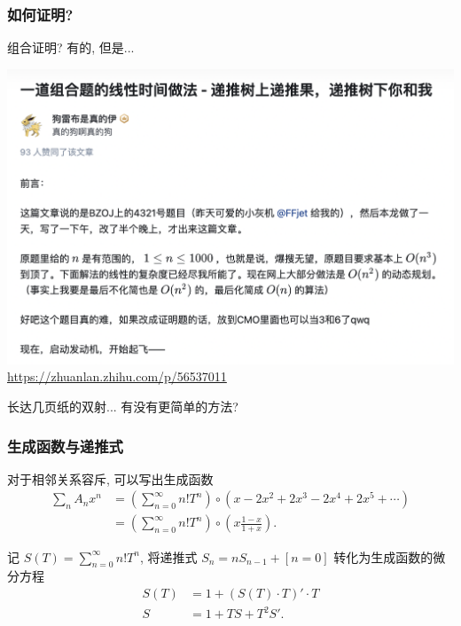 \documentclass{ctexbeamer}
\begin{document}
\begin{frame}
  \frametitle{如何证明?}

  组合证明? 有的, 但是...

  \begin{center}
    \includegraphics[scale=0.3]{zhihu.png}
    \url{https://zhuanlan.zhihu.com/p/56537011}
  \end{center}
  
  长达几页纸的双射... 有没有更简单的方法?
\end{frame}

\begin{frame}
  \frametitle{生成函数与递推式}

  对于相邻关系容斥, 可以写出生成函数
  \begin{align}
    \sum_n A_n x^n &= \left(\sum_{n=0}^\infty n! T^n\right) \circ \left( x - 2x^2 + 2x^3 - 2x^4 + 2x^5 + \cdots \right)\\
    &= \left(\sum_{n=0}^\infty n! T^n\right) \circ \left(x \frac {1-x}{1+x}\right).
  \end{align}

  \pause

  记 $S(T) = \sum_{n=0}^\infty n! T^n$, 将递推式 $S_n = nS_{n-1} + [n = 0]$ 转化为生成函数的微分方程
  \begin{align}
    S(T) &= 1 + (S(T) \cdot T)'\cdot T\\
    S &= 1 + TS + T^2S'.
  \end{align}

\end{frame}
\end{document}
